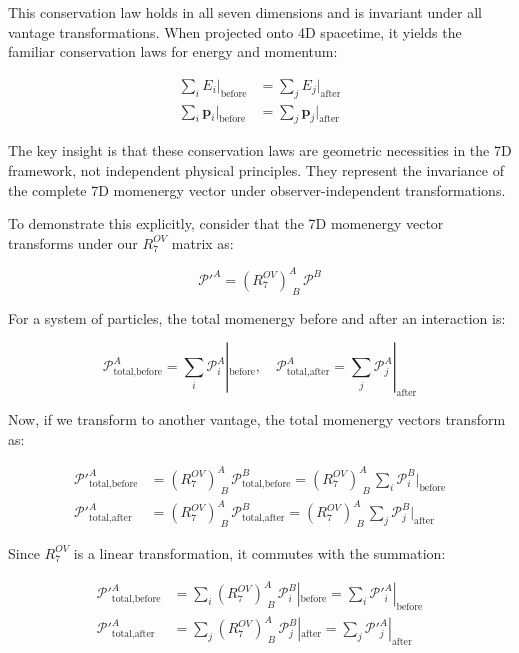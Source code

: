 \documentclass{article}
\begin{document}
This conservation law holds in all seven dimensions and is invariant under all vantage transformations. When projected onto 4D spacetime, it yields the familiar conservation laws for energy and momentum:

\begin{align}
\sum_i E_i|_{\text{before}} &= \sum_j E_j|_{\text{after}} \\
\sum_i \mathbf{p}_i|_{\text{before}} &= \sum_j \mathbf{p}_j|_{\text{after}}
\end{align}

The key insight is that these conservation laws are geometric necessities in the 7D framework, not independent physical principles. They represent the invariance of the complete 7D momenergy vector under observer-independent transformations.

To demonstrate this explicitly, consider that the 7D momenergy vector transforms under our $R^{OV}_7$ matrix as:

\begin{equation}
\mathcal{P}'^A = (R^{OV}_7)^A_{\,\,B} \, \mathcal{P}^B
\end{equation}

For a system of particles, the total momenergy before and after an interaction is:

\begin{equation}
\mathcal{P}^A_{\text{total,before}} = \sum_i \mathcal{P}^A_i|_{\text{before}}, \quad \mathcal{P}^A_{\text{total,after}} = \sum_j \mathcal{P}^A_j|_{\text{after}}
\end{equation}

Now, if we transform to another vantage, the total momenergy vectors transform as:

\begin{align}
\mathcal{P}'^A_{\text{total,before}} &= (R^{OV}_7)^A_{\,\,B} \, \mathcal{P}^B_{\text{total,before}} = (R^{OV}_7)^A_{\,\,B} \, \sum_i \mathcal{P}^B_i|_{\text{before}} \\
\mathcal{P}'^A_{\text{total,after}} &= (R^{OV}_7)^A_{\,\,B} \, \mathcal{P}^B_{\text{total,after}} = (R^{OV}_7)^A_{\,\,B} \, \sum_j \mathcal{P}^B_j|_{\text{after}}
\end{align}

Since $R^{OV}_7$ is a linear transformation, it commutes with the summation:

\begin{align}
\mathcal{P}'^A_{\text{total,before}} &= \sum_i (R^{OV}_7)^A_{\,\,B} \, \mathcal{P}^B_i|_{\text{before}} = \sum_i \mathcal{P}'^A_i|_{\text{before}} \\
\mathcal{P}'^A_{\text{total,after}} &= \sum_j (R^{OV}_7)^A_{\,\,B} \, \mathcal{P}^B_j|_{\text{after}} = \sum_j \mathcal{P}'^A_j|_{\text{after}}
\end{align}
\end{document}
